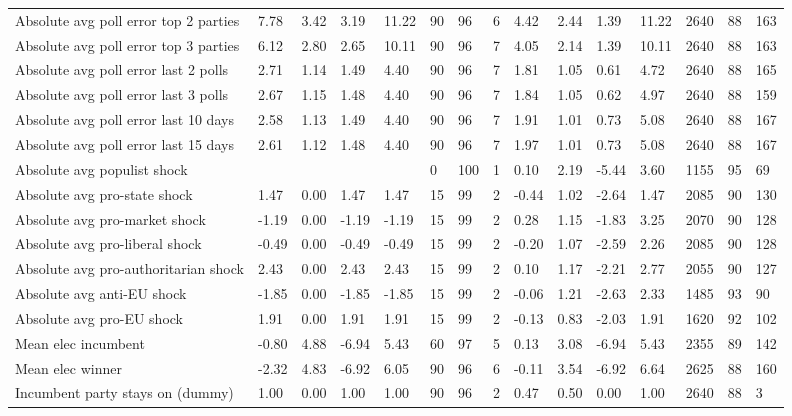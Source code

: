 \begin{longtable}{lllllllllllllll}
Absolute avg poll error top 2 parties & 7.78 & 3.42 & 3.19 & 11.22 & 90 & 96 & 6 & 4.42 & 2.44 & 1.39 & 11.22 & 2640 & 88 & 163\\
\addlinespace
Absolute avg poll error top 3 parties & 6.12 & 2.80 & 2.65 & 10.11 & 90 & 96 & 7 & 4.05 & 2.14 & 1.39 & 10.11 & 2640 & 88 & 163\\
Absolute avg poll error last 2 polls & 2.71 & 1.14 & 1.49 & 4.40 & 90 & 96 & 7 & 1.81 & 1.05 & 0.61 & 4.72 & 2640 & 88 & 165\\
Absolute avg poll error last 3 polls & 2.67 & 1.15 & 1.48 & 4.40 & 90 & 96 & 7 & 1.84 & 1.05 & 0.62 & 4.97 & 2640 & 88 & 159\\
Absolute avg poll error last 10 days & 2.58 & 1.13 & 1.49 & 4.40 & 90 & 96 & 7 & 1.91 & 1.01 & 0.73 & 5.08 & 2640 & 88 & 167\\
Absolute avg poll error last 15 days & 2.61 & 1.12 & 1.48 & 4.40 & 90 & 96 & 7 & 1.97 & 1.01 & 0.73 & 5.08 & 2640 & 88 & 167\\
\addlinespace
Absolute avg populist shock &  &  &  &  & 0 & 100 & 1 & 0.10 & 2.19 & -5.44 & 3.60 & 1155 & 95 & 69\\
Absolute avg pro-state shock & 1.47 & 0.00 & 1.47 & 1.47 & 15 & 99 & 2 & -0.44 & 1.02 & -2.64 & 1.47 & 2085 & 90 & 130\\
Absolute avg pro-market shock & -1.19 & 0.00 & -1.19 & -1.19 & 15 & 99 & 2 & 0.28 & 1.15 & -1.83 & 3.25 & 2070 & 90 & 128\\
Absolute avg pro-liberal shock & -0.49 & 0.00 & -0.49 & -0.49 & 15 & 99 & 2 & -0.20 & 1.07 & -2.59 & 2.26 & 2085 & 90 & 128\\
Absolute avg pro-authoritarian shock & 2.43 & 0.00 & 2.43 & 2.43 & 15 & 99 & 2 & 0.10 & 1.17 & -2.21 & 2.77 & 2055 & 90 & 127\\
\addlinespace
Absolute avg anti-EU shock & -1.85 & 0.00 & -1.85 & -1.85 & 15 & 99 & 2 & -0.06 & 1.21 & -2.63 & 2.33 & 1485 & 93 & 90\\
Absolute avg pro-EU shock & 1.91 & 0.00 & 1.91 & 1.91 & 15 & 99 & 2 & -0.13 & 0.83 & -2.03 & 1.91 & 1620 & 92 & 102\\
Mean elec incumbent & -0.80 & 4.88 & -6.94 & 5.43 & 60 & 97 & 5 & 0.13 & 3.08 & -6.94 & 5.43 & 2355 & 89 & 142\\
Mean elec winner & -2.32 & 4.83 & -6.92 & 6.05 & 90 & 96 & 6 & -0.11 & 3.54 & -6.92 & 6.64 & 2625 & 88 & 160\\
Incumbent party stays on (dummy) & 1.00 & 0.00 & 1.00 & 1.00 & 90 & 96 & 2 & 0.47 & 0.50 & 0.00 & 1.00 & 2640 & 88 & 3\\

\end{longtable}
